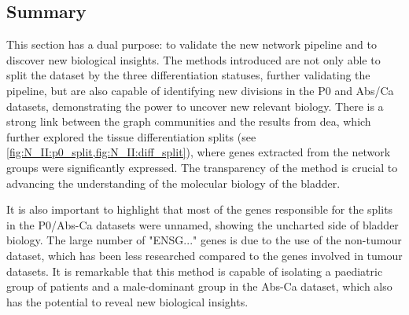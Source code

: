 \begin{figure}[H]
\begin{minipage}[t]{1.0\textwidth}
    \end{minipage}%
    \begin{minipage}[b]{0.2\textwidth}
        \centering
    \end{minipage}
    \label{fig:N_II:tum_morph}
\end{figure}



\subsection{Summary}


This section has a dual purpose: to validate the new network pipeline and to discover new biological insights. The methods introduced are not only able to split the dataset by the three differentiation statuses, further validating the pipeline, but are also capable of identifying new divisions in the P0 and Abs/Ca datasets, demonstrating the power to uncover new relevant biology. There is a strong link between the graph communities and the results from \acrfull{dea}, which further explored the tissue differentiation splits (see \cref{fig:N_II:p0_split,fig:N_II:diff_split}), where genes extracted from the network groups were significantly expressed. The transparency of the method is crucial to advancing the understanding of the molecular biology of the bladder.


It is also important to highlight that most of the genes responsible for the splits in the P0/Abs-Ca datasets were unnamed, showing the uncharted side of bladder biology. The large number of "ENSG..." genes is due to the use of the non-tumour dataset, which has been less researched compared to the genes involved in tumour datasets. It is remarkable that this method is capable of isolating a paediatric group of patients and a male-dominant group in the Abs-Ca dataset, which also has the potential to reveal new biological insights.

